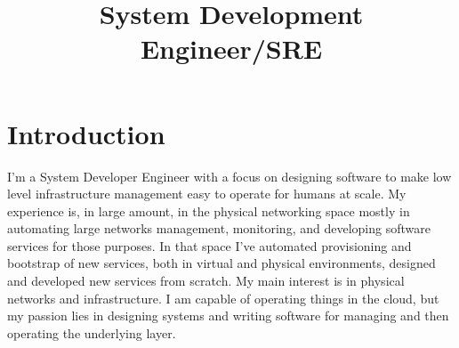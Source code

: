\documentclass[11pt,a4paper,sans]{moderncv}        %
\title{System Development Engineer/SRE}                               %
\begin{document}
\makecvtitle

\section{Introduction}
I'm a System Developer Engineer with a focus on designing software to make low level infrastructure management easy to operate for humans at scale.\newline{}
My experience is, in large amount, in the physical networking space mostly in automating large networks management, monitoring, and developing software services for those purposes.\newline{}
In that space I've automated provisioning and bootstrap of new services, both in virtual and physical environments, designed and developed new services from scratch.\newline{}
My main interest is in physical networks and infrastructure. I am capable of operating things in the cloud, but my passion lies in designing systems and writing software for managing and then operating the underlying layer.
\end{document}
